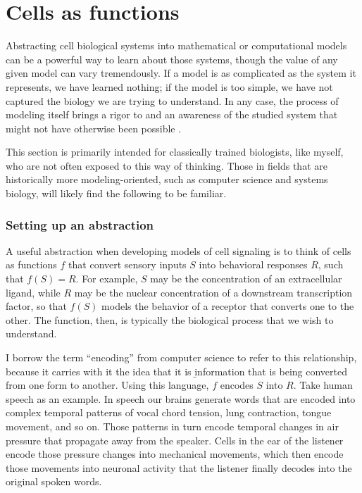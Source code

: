 \section{Cells as functions}
\label{introduction:hierarchy}

Abstracting cell biological systems into mathematical or computational
models can be a powerful way to learn about those systems, though the
value of any given model can vary tremendously. If a model is as
complicated as the system it represents,
we have learned nothing; if the model is too simple, we have not captured
the biology we are trying to understand. In any case, the process of modeling
itself brings a rigor to and an awareness of the studied system that might not have
otherwise been possible \cite{Janes2013,Zhang2013,Pe'er2011}.


This section is primarily intended for classically trained
biologists, like myself, who are not often exposed to this way of thinking.
Those in fields that are historically more modeling-oriented,
such as computer science and systems biology, will likely find the following
to be familiar.


\subsubsection{Setting up an abstraction}


A useful abstraction when developing models of
cell signaling is to think of cells
as functions $f$ that convert sensory inputs $S$
into behavioral responses $R$, such that $f(S)=R$. For example,
$S$ may be the concentration of an extracellular ligand, while
$R$ may be the nuclear concentration of a downstream
transcription factor, so that $f(S)$ models the
behavior of a receptor that converts one to the other.
The function, then, is typically the biological process that we wish
to understand.


I borrow the term ``encoding'' from computer science
to refer to this relationship, because it carries with it the
idea that it is \b{information} that is being converted from one form to another.
Using this language,
$f$ encodes $S$ into $R$. Take human speech as an example. 
In speech our brains generate
words that are encoded into complex temporal patterns of
vocal chord tension, lung contraction, tongue movement, and so
on. Those patterns in turn encode temporal changes in air
pressure that propagate away from the speaker. Cells
in the ear of the listener encode those pressure changes into
mechanical movements, which then encode those movements into
neuronal activity that the listener finally decodes into the
original spoken words.


